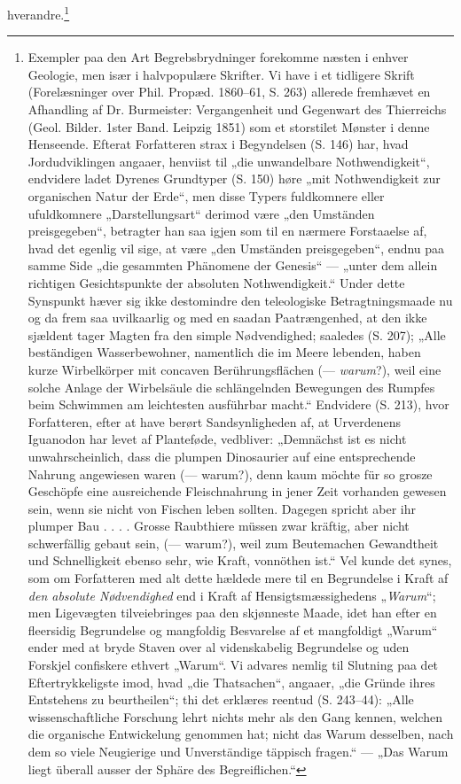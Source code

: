 \documentclass[12pt,a4paper]{book}
\begin{document}
hverandre.\footnote{%
Exempler paa den Art Begrebsbrydninger forekomme næsten i enhver Geologie, men
især i halvpopulære Skrifter. Vi have i et tidligere Skrift (Forelæsninger
over Phil. Propæd. 1860--61, S. 263) allerede fremhævet en Afhandling af Dr.
Burmeister: Vergangenheit und Gegenwart des Thierreichs (Geol. Bilder. 1ster
Band. Leipzig 1851) som et storstilet Mønster i denne Henseende. Efterat
Forfatteren strax i Begyndelsen (S. 146) har, hvad Jordudviklingen angaaer,
henviist til „die unwandelbare Nothwendigkeit“, endvidere ladet Dyrenes
Grundtyper (S. 150) høre „mit Nothwendigkeit zur organischen Natur der Erde“,
men disse Typers fuldkomnere eller ufuldkomnere „Darstellungsart“ derimod være
„den Umständen preisgegeben“, betragter han saa igjen som til en nærmere
Forstaaelse af, hvad det egenlig vil sige, at være „den Umständen
preisgegeben“, endnu paa samme Side „die gesammten Phänomene der Genesis“ ---
„unter dem allein richtigen Gesichtspunkte der absoluten Nothwendigkeit.“
Under dette Synspunkt hæver sig ikke destomindre den teleologiske
Betragtningsmaade nu og da frem saa uvilkaarlig og med en saadan
Paatrængenhed, at den ikke sjældent tager Magten fra den simple Nødvendighed;
saaledes (S. 207); „Alle beständigen Wasserbewohner, namentlich die im Meere
lebenden, haben kurze Wirbelkörper mit concaven Berührungsflächen (---
\emph{warum}?), weil eine solche Anlage der Wirbelsäule die schlängelnden
Bewegungen des Rumpfes beim Schwimmen am leichtesten ausführbar macht.“
Endvidere (S. 213), hvor Forfatteren, efter at have berørt Sandsynligheden af,
at Urverdenens Iguanodon har levet af Planteføde, vedbliver: „Demnächst ist es
nicht unwahrscheinlich, dass die plumpen Dinosaurier auf eine entsprechende
Nahrung angewiesen waren (--- warum?), denn kaum möchte für so grosze
Geschöpfe eine ausreichende Fleischnahrung in jener Zeit vorhanden gewesen
sein, wenn sie nicht von Fischen leben sollten. Dagegen spricht aber ihr
plumper Bau . . . . Grosse Raubthiere müssen zwar kräftig, aber nicht
schwerfällig gebaut sein, (--- warum?), weil zum Beutemachen Gewandtheit und
Schnelligkeit ebenso sehr, wie Kraft, vonnöthen ist.“ Vel kunde det synes, som
om Forfatteren med alt dette hældede mere til en Begrundelse i Kraft af
\emph{den absolute Nødvendighed} end i Kraft af Hensigtsmæssighedens
„\emph{Warum}“; men Ligevægten tilveiebringes paa den skjønneste Maade, idet
han efter en fleersidig Begrundelse og mangfoldig Besvarelse af et mangfoldigt
„Warum“ ender med at bryde Staven over al videnskabelig Begrundelse og uden
Forskjel confiskere ethvert „Warum“. Vi advares nemlig til Slutning paa det
Eftertrykkeligste imod, hvad „die Thatsachen“, angaaer, „die Gründe ihres
Entstehens zu beurtheilen“; thi det erklæres reentud (S. 243--44): „Alle
wissenschaftliche Forschung lehrt nichts mehr als den Gang kennen, welchen die
organische Entwickelung genommen hat; nicht das Warum desselben, nach dem so
viele Neugierige und Unverständige täppisch fragen.“ --- „Das Warum liegt
überall ausser der Sphäre des Begreiflichen.“}
\end{document}
